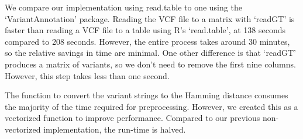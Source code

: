 \documentclass{bmcart}
\begin{document}
We compare our implementation using {\sc read.table} to one using the `VariantAnnotation' package. Reading the VCF file to a matrix with `readGT' is faster than reading a VCF file to a
table using R's `read.table', at 138 seconds compared to 208 seconds. However, the entire process takes around 30 minutes, so the relative savings in time are minimal.
One other difference is that `readGT' produces a matrix of variants, so we don't need to remove the first nine columns. However, this step takes less than one second.

The function to convert the variant strings to the Hamming distance consumes the majority of the time required for preprocessing. However, we created this as a vectorized function to
improve performance. Compared to our previous non-vectorized implementation, the run-time is halved.
\end{document}

